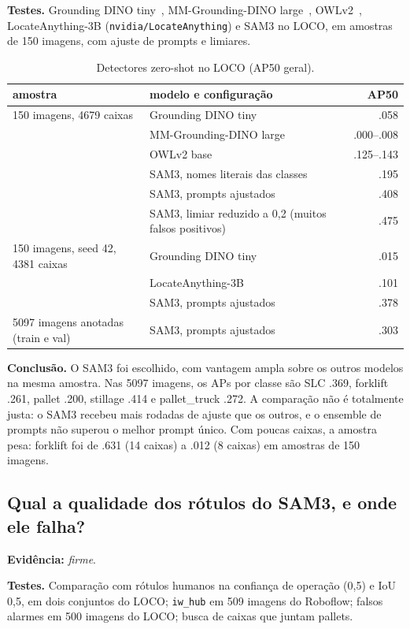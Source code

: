 \documentclass[11pt,a4paper]{article}
\newcommand{\evidencia}[1]{\noindent\textbf{Evidência:} \emph{#1}.\par}
\newcommand{\testes}{\noindent\textbf{Testes.} }
\newcommand{\conclusao}{\noindent\textbf{Conclusão.} }
\begin{document}
\testes Grounding DINO tiny~\cite{gdino}, MM-Grounding-DINO
large~\cite{mmgdino}, OWLv2~\cite{owlv2}, LocateAnything-3B
(\texttt{nvidia/LocateAnything}) e SAM3 no LOCO, em amostras de 150 imagens,
com ajuste de prompts e limiares.

\begin{table}[H]
\centering\small
\caption{Detectores zero-shot no LOCO (AP50 geral).}
\begin{tabular}{llr}
\toprule
amostra & modelo e configuração & AP50 \\
\midrule
150 imagens, 4679 caixas & Grounding DINO tiny & .058 \\
& MM-Grounding-DINO large & .000--.008 \\
& OWLv2 base & .125--.143 \\
& SAM3, nomes literais das classes & .195 \\
& SAM3, prompts ajustados & .408 \\
& SAM3, limiar reduzido a 0,2 (muitos falsos positivos) & .475 \\
\midrule
150 imagens, seed 42, 4381 caixas & Grounding DINO tiny & .015 \\
& LocateAnything-3B & .101 \\
& SAM3, prompts ajustados & .378 \\
\midrule
5097 imagens anotadas (train e val) & SAM3, prompts ajustados & .303 \\
\bottomrule
\end{tabular}
\end{table}

\conclusao O SAM3 foi escolhido, com vantagem ampla sobre os outros modelos na
mesma amostra. Nas 5097 imagens, os APs por classe são SLC .369, forklift .261,
pallet .200, stillage .414 e pallet\_truck .272. A comparação não é totalmente
justa: o SAM3 recebeu mais rodadas de ajuste que os outros, e o ensemble de
prompts não superou o melhor prompt único. Com poucas caixas, a amostra pesa:
forklift foi de .631 (14 caixas) a .012 (8 caixas) em amostras de 150 imagens.

\subsection{Qual a qualidade dos rótulos do SAM3, e onde ele falha?}
\evidencia{firme}

\testes Comparação com rótulos humanos na confiança de operação (0,5) e IoU 0,5,
em dois conjuntos do LOCO; \texttt{iw\_hub} em 509 imagens do Roboflow; falsos
alarmes em 500 imagens do LOCO; busca de caixas que juntam pallets.
\end{document}
